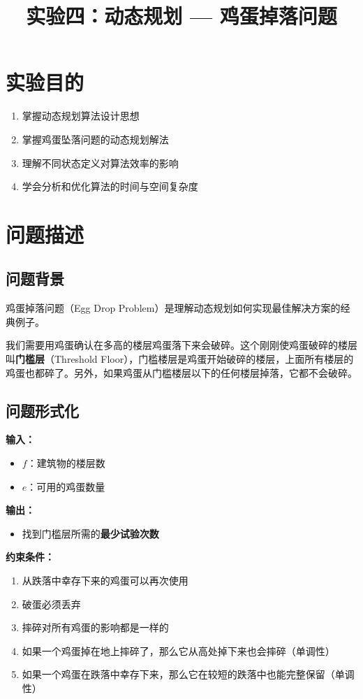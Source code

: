 \documentclass[12pt,a4paper]{article}
\title{实验四：动态规划 --- 鸡蛋掉落问题}
\author{}
\date{}
\begin{document}
\maketitle

\section{实验目的}

\begin{enumerate}
    \item 掌握动态规划算法设计思想
    \item 掌握鸡蛋坠落问题的动态规划解法
    \item 理解不同状态定义对算法效率的影响
    \item 学会分析和优化算法的时间与空间复杂度
\end{enumerate}

\section{问题描述}

\subsection{问题背景}

鸡蛋掉落问题（Egg Drop Problem）是理解动态规划如何实现最佳解决方案的经典例子。

我们需要用鸡蛋确认在多高的楼层鸡蛋落下来会破碎。这个刚刚使鸡蛋破碎的楼层叫\textbf{门槛层}（Threshold Floor），门槛楼层是鸡蛋开始破碎的楼层，上面所有楼层的鸡蛋也都碎了。另外，如果鸡蛋从门槛楼层以下的任何楼层掉落，它都不会破碎。

\subsection{问题形式化}

\textbf{输入：}
\begin{itemize}
    \item $f$：建筑物的楼层数
    \item $e$：可用的鸡蛋数量
\end{itemize}

\textbf{输出：}
\begin{itemize}
    \item 找到门槛层所需的\textbf{最少试验次数}
\end{itemize}

\textbf{约束条件：}
\begin{enumerate}
    \item 从跌落中幸存下来的鸡蛋可以再次使用
    \item 破蛋必须丢弃
    \item 摔碎对所有鸡蛋的影响都是一样的
    \item 如果一个鸡蛋掉在地上摔碎了，那么它从高处掉下来也会摔碎（单调性）
    \item 如果一个鸡蛋在跌落中幸存下来，那么它在较短的跌落中也能完整保留（单调性）
\end{enumerate}
\end{document}
